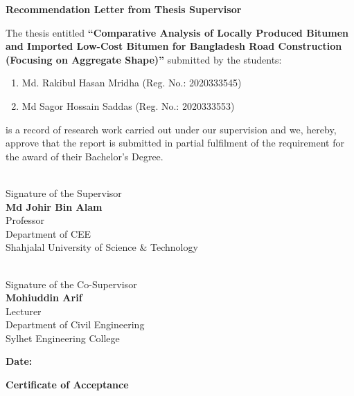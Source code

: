 \documentclass[12pt,a4paper]{article}
\begin{document}
\newpage
{}
{}
\begin{center}
    \Large \textbf{Recommendation Letter from Thesis Supervisor}
\end{center}
\vspace{1.5cm}



The thesis entitled \textbf{``Comparative Analysis of Locally Produced Bitumen and Imported Low-Cost Bitumen for Bangladesh Road Construction (Focusing on Aggregate Shape)''} submitted by the students:
\begin{enumerate}
    \item Md. Rakibul Hasan Mridha (Reg. No.: 2020333545)
    \item Md Sagor Hossain Saddas (Reg. No.: 2020333553)
\end{enumerate}
is a record of research work carried out under our supervision and we, hereby, approve that the report is submitted in partial fulfilment of the requirement for the award of their Bachelor's Degree.

\vspace{3.5cm}

\noindent
\begin{minipage}[t]{0.48\textwidth}
    \noindent\makebox[2.5in]{\hrulefill} \\
    Signature of the Supervisor \\
    \textbf{Md Johir Bin Alam} \\
    Professor \\
    Department of CEE \\
    Shahjalal University of Science \& Technology
\end{minipage}
\hfill
\begin{minipage}[t]{0.48\textwidth}
    \noindent\makebox[2.5in]{\hrulefill} \\
    Signature of the Co-Supervisor \\
    \textbf{Mohiuddin Arif} \\
    Lecturer \\
    Department of Civil Engineering \\
    Sylhet Engineering College
\end{minipage}

\vspace{2cm}

\noindent \textbf{Date:} \makebox[2.5in]{\hrulefill}

\newpage
{}
{}
\begin{center}
    \Large \textbf{Certificate of Acceptance}
\end{center}
\vspace{1cm}
\end{document}
